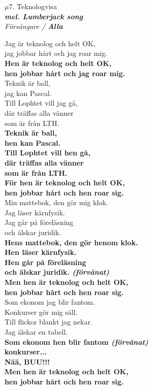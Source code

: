\documentclass[a6paper,10pt]{article}
\newcommand{\mel}[1]{\small\textbf{\textit{mel. #1 \\}}}
\begin{document}
\setlength{\oddsidemargin}{-0.37in}
\noindent
\begin{center}
\Large $\mu$7. Teknologvisa\\
\mel{Lumberjack song}
\textit{Försångare / \textbf{Alla}}
\end{center}
Jag är teknolog och helt OK,\\
jag jobbar hårt och jag roar mig.\\
\textbf{Hen är teknolog och helt OK,\\
hen jobbar hårt och jag roar mig.}
\vspace{5pt}\\
Teknik är ball,\\
jag kan Pascal.\\
Till Lophtet vill jag gå,\\
där träffas alla vänner\\
som är från LTH.
\vspace{5pt}\\
\textbf{Teknik är ball,\\
hen kan Pascal.\\
Till Lophtet vill hen gå,\\
där träffas alla vänner\\
som är från LTH.
\vspace{5pt}\\
För hen är teknolog och helt OK,\\
hen jobbar hårt och hen roar sig.}
\vspace{5pt}\\
Min mattebok, den gör mig klok.\\
Jag läser kärnfysik.\\
Jag går på föreläsning\\
och älskar juridik.
\vspace{5pt}\\
\textbf{Hens mattebok, den gör henom klok.\\
Hen läser kärnfysik.\\
Hen går på föreläsning\\
och älskar juridik. \textit{(förvånat)}
\vspace{5pt}\\
Men hen är teknolog och helt OK,\\
hen jobbar hårt och hen roar sig.}
\vspace{5pt}\\

\newpage
\setlength{\oddsidemargin}{-0.47in}
\noindent
Som ekonom jag blir fantom.\\
Konkurser gör mig säll.\\
Till flickor blankt jag nekar.\\
Jag älskar en tabell.
\vspace{5pt}\\
\textbf{Som ekonom hen blir fantom \textit{(förvånat)}\\
konkurser...\\
Nää, BUU!!!
\vspace{5pt}\\
Men hen är teknolog och helt OK,\\
hen jobbar hårt och hen roar sig.}
\end{document}
